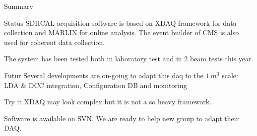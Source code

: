 \begin{frame}{Summary}
  \begin{block}{Status}
    SDHCAL acquisition software is based on XDAQ framework for data
    collection and MARLIN for online analysis. The event builder of CMS is
    also used for coherent data collection. 
    \par
    The system has been tested both in laboratory test and in 2 beam tests
    this year.
  \end{block}
  \begin{block}{Futur}
    Several developments are on-going to adapt this daq to the $1 ~ m^3$
    scale: LDA \& DCC integration, Configuration DB and monitoring
  \end{block}

  \begin{block}{Try it}
    XDAQ may look complex but it is not a so heavy framework. 
    \par
    Software is available on SVN. We are ready to help new group to adapt
    their DAQ.
  \end{block}
\end{frame}
